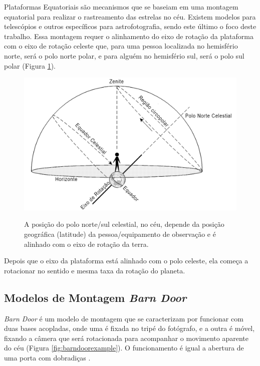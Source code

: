 Plataformas Equatoriais são mecanismos que se baseiam em uma montagem equatorial para realizar o rastreamento das estrelas no céu. Existem modelos para telescópios e outros específicos para astrofotografia, sendo este último o foco deste trabalho. Essa montagem requer o alinhamento do eixo de rotação da plataforma com o eixo de rotação celeste que, para uma pessoa localizada no hemisfério norte, será o polo norte polar, e para alguém no hemisfério sul, será o polo sul polar (Figura \ref{fig:celestialchart}). 

\begin{figure}[!htb]
	\centering
	\caption{A posição do polo norte/sul celestial, no céu, depende da posição geográfica (latitude) da pessoa/equipamento de observação e é alinhado com o eixo de rotação da terra.}
	\includegraphics[width=0.8\linewidth]{figuras/revisaobiblio/celestialchart}
	\label{fig:celestialchart}
\end{figure}

Depois que o eixo da plataforma está alinhado com o polo celeste, ela começa a rotacionar no sentido e mesma taxa da rotação do planeta.

\subsection[Modelos de Montagem]{Modelos de Montagem \textit{Barn Door}}
\textit{Barn Door} é um modelo de montagem que se caracterizam por funcionar com duas bases acopladas, onde uma é fixada no tripé do fotógrafo, e a outra é móvel, fixando a câmera que será rotacionada para acompanhar o movimento aparente do céu (Figura \ref{fig:barndoorexample}). O funcionamento é igual a abertura de uma porta com dobradiças \cite{site:pentaxBarnDoor}. 

